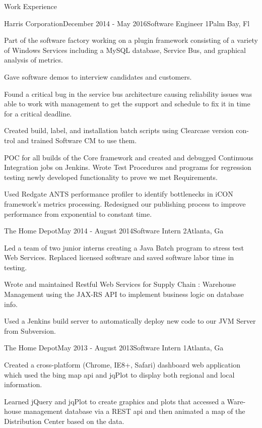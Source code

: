 \documentclass{resume} %
\begin{document}
\begin{rSection}{Work Experience}
\begin{rSubsection}{Harris Corporation}{December 2014 - May 2016}{Software Engineer 1}{Palm Bay, Fl}
\item  Part of the software factory working on a plugin framework consisting of a variety of Windows Services including a MySQL database, Service Bus, and graphical analysis of metrics. 
\item Gave software demos to interview candidates and customers.
\item Found a critical bug in the service bus architecture causing reliability issues was able to work with management to get the support and schedule to fix it in time for a critical deadline.
\item Created build, label, and installation batch scripts using Clearcase version con- trol and trained Software CM to use them. 
\item  POC for all builds of the Core framework and created and debugged Continuous Integration jobs on Jenkins. Wrote Test Procedures and programs for regression testing newly developed functionality to prove we met Requirements. 
\item Used Redgate ANTS performance profiler to identify bottlenecks in iCON framework’s metrics processing. Redesigned our publishing process to improve performance from exponential to constant time. 
\end{rSubsection}

\begin{rSubsection}{The Home Depot}{May 2014 - August 2014}{Software Intern 2}{Atlanta, Ga}
\item Led a team of two junior interns creating a Java Batch program to stress test Web Services. Replaced licensed software and saved software labor time in testing. 
\item Wrote and maintained Restful Web Services for Supply Chain : Warehouse Management using the JAX-RS API to implement business logic on database info. 
\item Used a Jenkins build server to automatically deploy new code to our JVM Server from Subversion. 
\end{rSubsection}
\begin{rSubsection}{The Home Depot}{May 2013 - August 2013}{Software Intern 1}{Atlanta, Ga}
\item Created a cross-platform (Chrome, IE8+, Safari) dashboard web application which used the bing map api and jqPlot to display both regional and local information. 
\item Learned jQuery and jqPlot to create graphics and plots that accessed a Ware- house management database via a REST api and then animated a map of the Distribution Center based on the data. 
\end{rSubsection}
\end{rSection}






\end{document}
